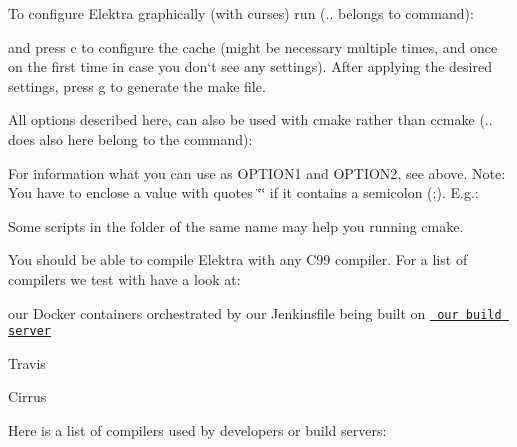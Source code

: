 To configure Elektra graphically (with curses) run ({\ttfamily ..} belongs to command)\+:


\begin{DoxyCode}{0}
\end{DoxyCode}


and press {\ttfamily c} to configure the cache (might be necessary multiple times, and once on the first time in case you don‘t see any settings). After applying the desired settings, press {\ttfamily g} to generate the make file.

All options described here, can also be used with {\ttfamily cmake} rather than {\ttfamily ccmake} ({\ttfamily ..} does also here belong to the command)\+:


\begin{DoxyCode}{0}
\end{DoxyCode}


For information what you can use as {\ttfamily O\+P\+T\+I\+O\+N1} and {\ttfamily O\+P\+T\+I\+O\+N2}, see above. Note\+: You have to enclose a value with quotes {\ttfamily \char`\"{}\char`\"{}} if it contains a semicolon ({\ttfamily ;}). E.\+g.\+:


\begin{DoxyCode}{0}
\end{DoxyCode}


Some scripts in the folder of the same name may help you running cmake.

You should be able to compile Elektra with any C99 compiler. For a list of compilers we test with have a look at\+:


\begin{DoxyItemize}
\item our Docker containers orchestrated by our Jenkinsfile being built on \href{https://build.libelektra.org/}{\texttt{ our build server}}
\item Travis
\item Cirrus
\end{DoxyItemize}

Here is a list of compilers used by developers or build servers\+:

